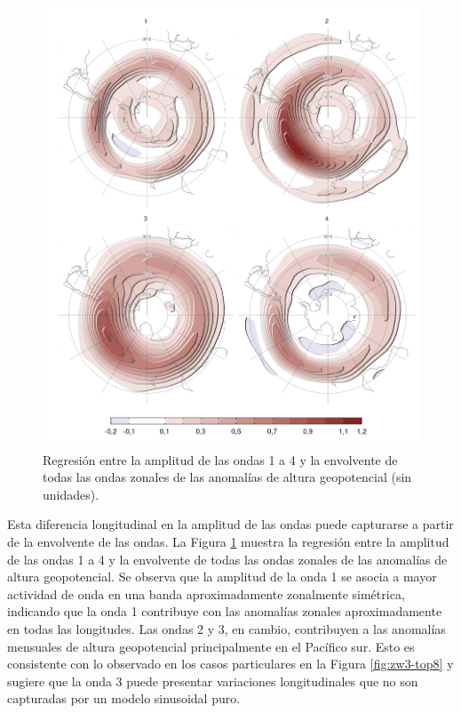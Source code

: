 \documentclass[12pt,oneside,a4paper]{reedthesis}
\begin{document}
\begin{figure}

{\centering \includegraphics{figures/15-onda3/envelope-regr-1} 

}

\caption{Regresión entre la amplitud de las ondas 1 a 4 y la envolvente de todas las ondas zonales de las anomalías de altura geopotencial (sin unidades).}\label{fig:envelope-regr}
\end{figure}



Esta diferencia longitudinal en la amplitud de las ondas puede capturarse a partir de la envolvente de las ondas.
La Figura \ref{fig:envelope-regr} muestra la regresión entre la amplitud de las ondas 1 a 4 y la envolvente de todas las ondas zonales de las anomalías de altura geopotencial.
Se observa que la amplitud de la onda 1 se asocia a mayor actividad de onda en una banda aproximadamente zonalmente simétrica, indicando que la onda 1 contribuye con las anomalías zonales aproximadamente en todas las longitudes.
Las ondas 2 y 3, en cambio, contribuyen a las anomalías mensuales de altura geopotencial principalmente en el Pacífico sur.
Esto es consistente con lo observado en los casos particulares en la Figura \ref{fig:zw3-top8} y sugiere que la onda 3 puede presentar variaciones longitudinales que no son capturadas por un modelo sinusoidal puro.
\end{document}
